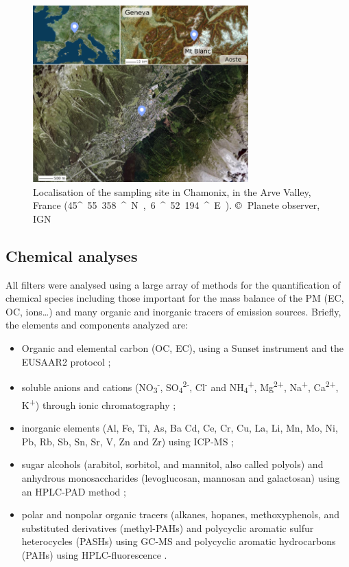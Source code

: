 \documentclass[acp, manuscript]{copernicus}
\begin{document}
\begin{figure}[h]
    \centering
    \includegraphics[width=8.3cm]{figures/fig01.png}
    \caption{Localisation of the sampling site in Chamonix, in the Arve Valley,
    France (45\unit{^\circ}55.358\unit{^\prime}~N,
6\unit{^\circ}52.194\unit{^\prime}~E).  $\copyright$~Planete observer, IGN}
    \label{fig:cham}
\end{figure}

\subsection{Chemical analyses }\label{chemical-analyses}

All filters were analysed using a large array of methods for the quantification
of chemical species including those important for the mass balance of the PM
(EC, OC, ions\ldots{}) and many organic and inorganic tracers of emission
sources. Briefly, the elements and components analyzed are:

\begin{itemize}
\item
  Organic and elemental carbon (OC, EC), using a Sunset instrument and
  the EUSAAR2 protocol \citep{aymoz_evolution_2004,cavalli_european_2016};
\item
  soluble anions and cations (NO\textsubscript{3}\textsuperscript{-},
  SO\textsubscript{4}\textsuperscript{2-}, Cl\textsuperscript{-} and
  NH\textsubscript{4}\textsuperscript{+}, Mg\textsuperscript{2+},
  Na\textsuperscript{+}, Ca\textsuperscript{2+}, K\textsuperscript{+})
  through ionic chromatography \citep{waked_source_2014};
\item
  inorganic elements (Al, Fe, Ti, As, Ba Cd, Ce, Cr, Cu, La, Li, Mn, Mo,
  Ni, Pb, Rb, Sb, Sn, Sr, V, Zn and Zr) using ICP-MS \citep{waked_source_2014};
\item
  sugar alcohols (arabitol, sorbitol, and mannitol, also called polyols)
  and anhydrous monosaccharides (levoglucosan, mannosan and galactosan)
  using an HPLC-PAD method \citep{waked_source_2014};
\item
  polar and nonpolar organic tracers (alkanes, hopanes, methoxyphenols,
  and substituted derivatives (methyl-PAHs) and polycyclic aromatic
  sulfur heterocycles (PASHs) using GC-MS and polycyclic aromatic
  hydrocarbons (PAHs) using HPLC-fluorescence \citep{golly_large_2015}.
\end{itemize}
\end{document}
